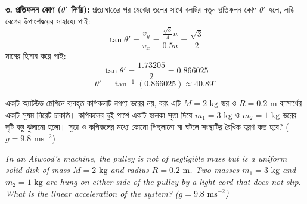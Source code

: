 \documentclass[12pt, a4paper]{article}
\begin{document}
{\begin{tcolorbox}[solutionbox={সমাধান (Solution)}]
\vspace{0.5em}
\textbf{৩. প্রতিফলন কোণ ($\theta'$ নির্ণয়):}
প্রত্যাঘাতের পর মেঝের তলের সাথে বলটির নতুন প্রতিফলন কোণ $\theta'$ হলে, লব্ধি বেগের উপাংশদ্বয়ের সাহায্যে পাই:
$$\tan\theta' = \frac{v_y}{v_x} = \frac{\frac{\sqrt{3}}{4} u}{0.5 u} = \frac{\sqrt{3}}{2}$$
মানের হিসাব করে পাই:
$$\tan\theta' = \frac{1.73205}{2} = 0.866025$$
$$\theta' = \tan^{-1}(0.866025) \approx 40.89^\circ$$
\end{tcolorbox}
\vspace{1em}
\begin{tcolorbox}[questionbox={প্রশ্ন (Question) 22}]
\noindent
একটি অ্যাটউড মেশিনে ব্যবহৃত কপিকলটি নগণ্য ভরের নয়, বরং এটি $M = 2\text{ kg}$ ভর ও $R = 0.2\text{ m}$ ব্যাসার্ধের একটি সুষম নিরেট চাকতি। কপিকলের দুই পাশে একটি হালকা সুতা দিয়ে $m_1 = 3\text{ kg}$ ও $m_2 = 1\text{ kg}$ ভরের দুটি বস্তু ঝুলানো হলো। সুতা ও কপিকলের মধ্যে কোনো পিছলানো না ঘটলে সংস্থাটির রৈখিক ত্বরণ কত হবে? ($g = 9.8\text{ ms}^{-2}$)

\vspace{0.8em}
\begin{english}
\noindent\textit{\color{darkgray}
In an Atwood's machine, the pulley is not of negligible mass but is a uniform solid disk of mass $M = 2\text{ kg}$ and radius $R = 0.2\text{ m}$. Two masses $m_1 = 3\text{ kg}$ and $m_2 = 1\text{ kg}$ are hung on either side of the pulley by a light cord that does not slip. What is the linear acceleration of the system? ($g = 9.8\text{ ms}^{-2}$)
}
\end{english}
\end{tcolorbox}

\vspace{1em}
\begin{center}
\end{center}}
\end{document}
